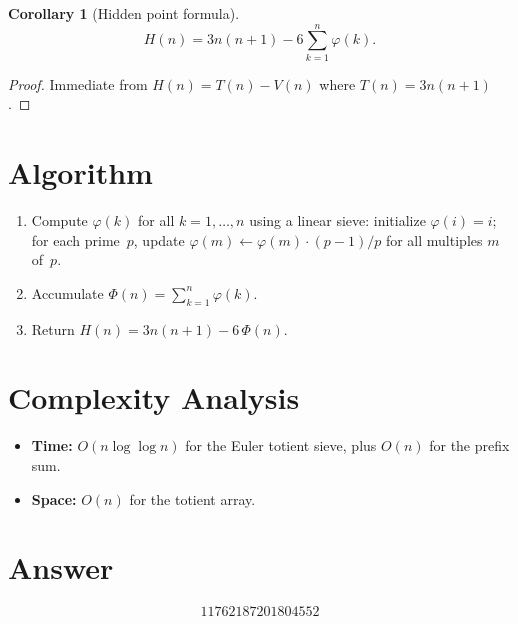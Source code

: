 \documentclass[a4paper,12pt]{article}
\newtheorem{corollary}[theorem]{Corollary}
\begin{document}
\begin{corollary}[Hidden point formula]
\[
H(n) = 3n(n+1) - 6\sum_{k=1}^{n}\varphi(k).
\]
\end{corollary}

\begin{proof}
Immediate from $H(n) = T(n) - V(n)$ where $T(n) = 3n(n+1)$.
\end{proof}

\section{Algorithm}

\begin{enumerate}
    \item Compute $\varphi(k)$ for all $k = 1, \ldots, n$ using a linear sieve: initialize $\varphi(i) = i$; for each prime~$p$, update $\varphi(m) \leftarrow \varphi(m) \cdot (p-1)/p$ for all multiples $m$ of~$p$.
    \item Accumulate $\Phi(n) = \sum_{k=1}^{n}\varphi(k)$.
    \item Return $H(n) = 3n(n+1) - 6\,\Phi(n)$.
\end{enumerate}

\section{Complexity Analysis}

\begin{itemize}
    \item \textbf{Time:} $O(n \log\log n)$ for the Euler totient sieve, plus $O(n)$ for the prefix sum.
    \item \textbf{Space:} $O(n)$ for the totient array.
\end{itemize}

\section{Answer}

\[
\boxed{11762187201804552}
\]
\end{document}
